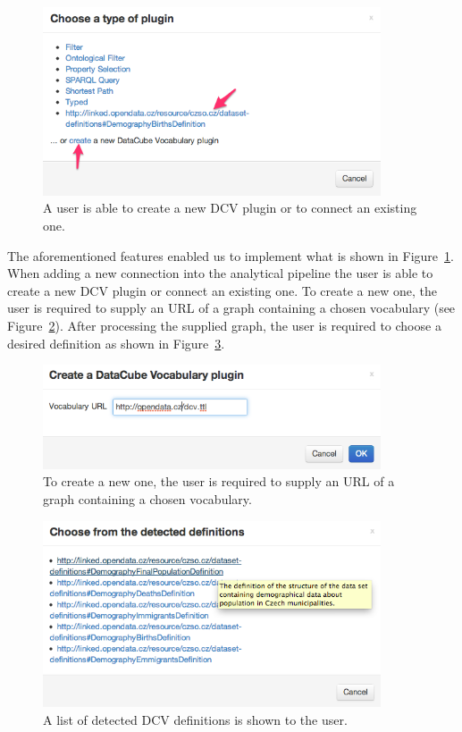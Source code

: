 \begin{figure}
	\centering
	\includegraphics[width=100mm]{img/choose-plugin.png}
	\caption{A user is able to create a new DCV plugin or to connect an existing one.}
	\label{fig:choose-plugin}
\end{figure}

The aforementioned features enabled us to implement what is shown in 
Figure~\ref{fig:choose-plugin}. When adding a new connection into the analytical 
pipeline the user is able to create a new DCV plugin or connect an existing one. 
To create a new one, the user is required to supply an URL of a graph containing 
a chosen vocabulary (see Figure~\ref{fig:create-plugin}). After processing the 
supplied graph, the user is required to choose a desired definition as shown in 
Figure~\ref{fig:choose-def}.

\begin{figure}
	\centering
	\includegraphics[width=100mm]{img/create-dcv.png}
	\caption{To create a new one, the user is required to supply an URL of a graph containing 
a chosen vocabulary.}
	\label{fig:create-plugin}
\end{figure}


\begin{figure}
	\centering
	\includegraphics[width=100mm]{img/choose-def.png}
	\caption{A list of detected DCV definitions is shown to the user.}
	\label{fig:choose-def}
\end{figure}

